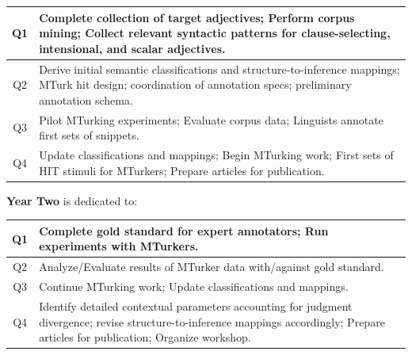 \documentclass[10pt]{article}
\newcommand{\miniskip}{\vspace*{1mm}}
\begin{document}
\vspace{1mm}\noindent
{\small
\begin{tabularx}{470pt}{|c|X|}

\hline

Q1 & Complete collection of target adjectives; Perform corpus mining;  Collect relevant syntactic patterns for clause-selecting, intensional, and scalar adjectives. 
\\
\hline

Q2 & Derive initial semantic classifications and structure-to-inference mappings; MTurk hit design; coordination of annotation specs; preliminary annotation schema.
 \\

\hline

Q3 & Pilot MTurking experiments;  Evaluate corpus data; Linguists annotate first sets of snippets.    \\
 
\hline

Q4 & Update classifications and mappings; Begin MTurking work; First sets of HIT stimuli for MTurkers; Prepare articles for publication.     \\

\hline

\end{tabularx}
}

\miniskip\noindent
{\bf Year Two} is dedicated to: 

\vspace{1mm}\noindent
{\small
\begin{tabularx}{470pt}{|c|X|}

\hline

Q1 	&  Complete gold standard for expert annotators; Run experiments with MTurkers. \\

\hline

Q2	& Analyze/Evaluate results of MTurker data with/against gold standard. \\

\hline

Q3	&  Continue MTurking work; Update classifications and mappings. \\

\hline

Q4	& Identify detailed contextual parameters accounting for judgment divergence; revise structure-to-inference mappings accordingly; Prepare articles for
       publication;  Organize workshop. \\
\hline

\end{tabularx}
}
\end{document}

